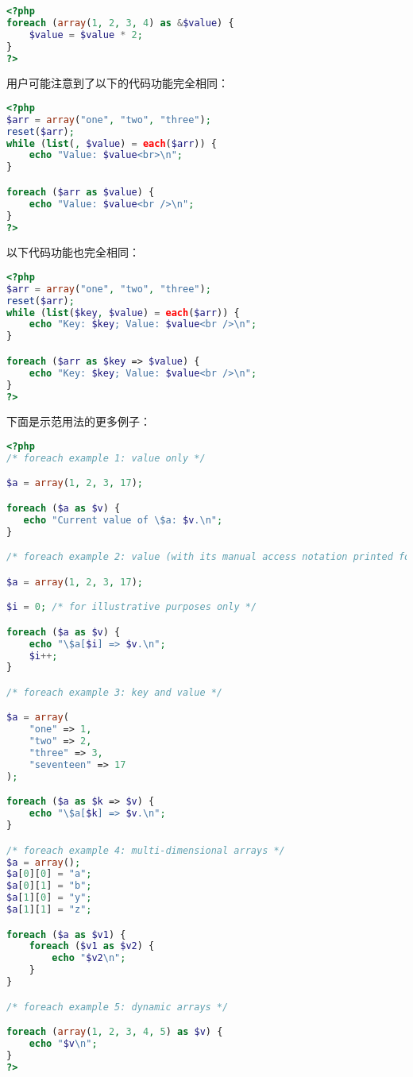 \begin{lstlisting}[language=PHP]
<?php
foreach (array(1, 2, 3, 4) as &$value) {
    $value = $value * 2;
}
?>
\end{lstlisting}



用户可能注意到了以下的代码功能完全相同：

\begin{lstlisting}[language=PHP]
<?php
$arr = array("one", "two", "three");
reset($arr);
while (list(, $value) = each($arr)) {
    echo "Value: $value<br>\n";
}

foreach ($arr as $value) {
    echo "Value: $value<br />\n";
}
?>
\end{lstlisting}

以下代码功能也完全相同：

\begin{lstlisting}[language=PHP]
<?php
$arr = array("one", "two", "three");
reset($arr);
while (list($key, $value) = each($arr)) {
    echo "Key: $key; Value: $value<br />\n";
}

foreach ($arr as $key => $value) {
    echo "Key: $key; Value: $value<br />\n";
}
?>
\end{lstlisting}


下面是示范用法的更多例子：

\begin{lstlisting}[language=PHP]
<?php
/* foreach example 1: value only */

$a = array(1, 2, 3, 17);

foreach ($a as $v) {
   echo "Current value of \$a: $v.\n";
}

/* foreach example 2: value (with its manual access notation printed for illustration) */

$a = array(1, 2, 3, 17);

$i = 0; /* for illustrative purposes only */

foreach ($a as $v) {
    echo "\$a[$i] => $v.\n";
    $i++;
}

/* foreach example 3: key and value */

$a = array(
    "one" => 1,
    "two" => 2,
    "three" => 3,
    "seventeen" => 17
);

foreach ($a as $k => $v) {
    echo "\$a[$k] => $v.\n";
}

/* foreach example 4: multi-dimensional arrays */
$a = array();
$a[0][0] = "a";
$a[0][1] = "b";
$a[1][0] = "y";
$a[1][1] = "z";

foreach ($a as $v1) {
    foreach ($v1 as $v2) {
        echo "$v2\n";
    }
}

/* foreach example 5: dynamic arrays */

foreach (array(1, 2, 3, 4, 5) as $v) {
    echo "$v\n";
}
?>
\end{lstlisting}




